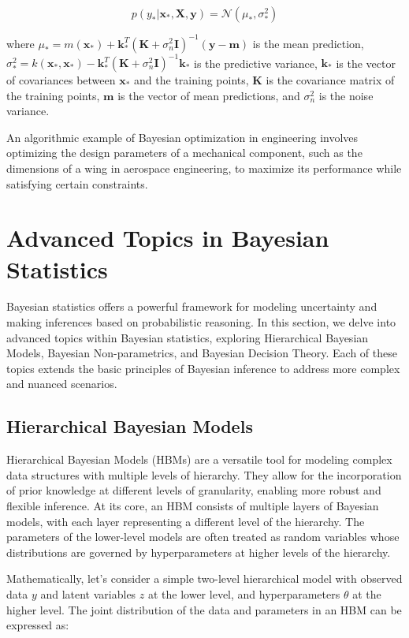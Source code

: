 \documentclass[12pt]{book} %
\begin{document}
\[
p(y_* | \mathbf{x}_*, \mathbf{X}, \mathbf{y}) = \mathcal{N}(\mu_*, \sigma_*^2)
\]

where \( \mu_* = m(\mathbf{x}_*) + \mathbf{k}_*^T(\mathbf{K} + \sigma_n^2\mathbf{I})^{-1}(\mathbf{y} - \mathbf{m}) \) is the mean prediction, \( \sigma_*^2 = k(\mathbf{x}_*, \mathbf{x}_*) - \mathbf{k}_*^T(\mathbf{K} + \sigma_n^2\mathbf{I})^{-1}\mathbf{k}_* \) is the predictive variance, \( \mathbf{k}_* \) is the vector of covariances between \( \mathbf{x}_* \) and the training points, \( \mathbf{K} \) is the covariance matrix of the training points, \( \mathbf{m} \) is the vector of mean predictions, and \( \sigma_n^2 \) is the noise variance.

An algorithmic example of Bayesian optimization in engineering involves optimizing the design parameters of a mechanical component, such as the dimensions of a wing in aerospace engineering, to maximize its performance while satisfying certain constraints.


\section{Advanced Topics in Bayesian Statistics}
Bayesian statistics offers a powerful framework for modeling uncertainty and making inferences based on probabilistic reasoning. In this section, we delve into advanced topics within Bayesian statistics, exploring Hierarchical Bayesian Models, Bayesian Non-parametrics, and Bayesian Decision Theory. Each of these topics extends the basic principles of Bayesian inference to address more complex and nuanced scenarios.

\subsection{Hierarchical Bayesian Models}
Hierarchical Bayesian Models (HBMs) are a versatile tool for modeling complex data structures with multiple levels of hierarchy. They allow for the incorporation of prior knowledge at different levels of granularity, enabling more robust and flexible inference. At its core, an HBM consists of multiple layers of Bayesian models, with each layer representing a different level of the hierarchy. The parameters of the lower-level models are often treated as random variables whose distributions are governed by hyperparameters at higher levels of the hierarchy.

Mathematically, let's consider a simple two-level hierarchical model with observed data $y$ and latent variables $z$ at the lower level, and hyperparameters $\theta$ at the higher level. The joint distribution of the data and parameters in an HBM can be expressed as:
\end{document}
